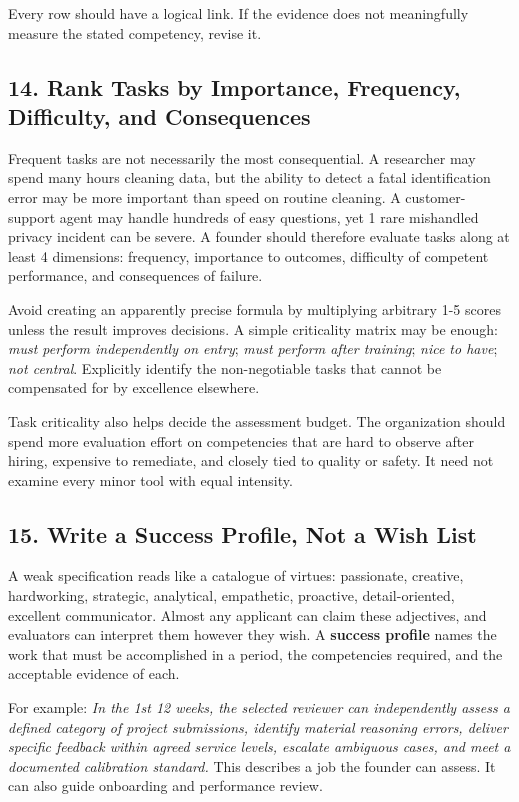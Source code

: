 Every row should have a logical link. If the evidence does not meaningfully measure the stated competency, revise it.

\subsection*{14. Rank Tasks by Importance, Frequency, Difficulty, and Consequences}

Frequent tasks are not necessarily the most consequential. A researcher may spend many hours cleaning data, but the ability to detect a fatal identification error may be more important than speed on routine cleaning. A customer-support agent may handle hundreds of easy questions, yet 1 rare mishandled privacy incident can be severe. A founder should therefore evaluate tasks along at least 4 dimensions: frequency, importance to outcomes, difficulty of competent performance, and consequences of failure.

Avoid creating an apparently precise formula by multiplying arbitrary 1-5 scores unless the result improves decisions. A simple criticality matrix may be enough: \textit{must perform independently on entry}; \textit{must perform after training}; \textit{nice to have}; \textit{not central}. Explicitly identify the non-negotiable tasks that cannot be compensated for by excellence elsewhere.

Task criticality also helps decide the assessment budget. The organization should spend more evaluation effort on competencies that are hard to observe after hiring, expensive to remediate, and closely tied to quality or safety. It need not examine every minor tool with equal intensity.

\subsection*{15. Write a Success Profile, Not a Wish List}

A weak specification reads like a catalogue of virtues: passionate, creative, hardworking, strategic, analytical, empathetic, proactive, detail-oriented, excellent communicator. Almost any applicant can claim these adjectives, and evaluators can interpret them however they wish. A \textbf{success profile} names the work that must be accomplished in a period, the competencies required, and the acceptable evidence of each.

For example: \textit{In the 1st 12 weeks, the selected reviewer can independently assess a defined category of project submissions, identify material reasoning errors, deliver specific feedback within agreed service levels, escalate ambiguous cases, and meet a documented calibration standard.} This describes a job the founder can assess. It can also guide onboarding and performance review.

